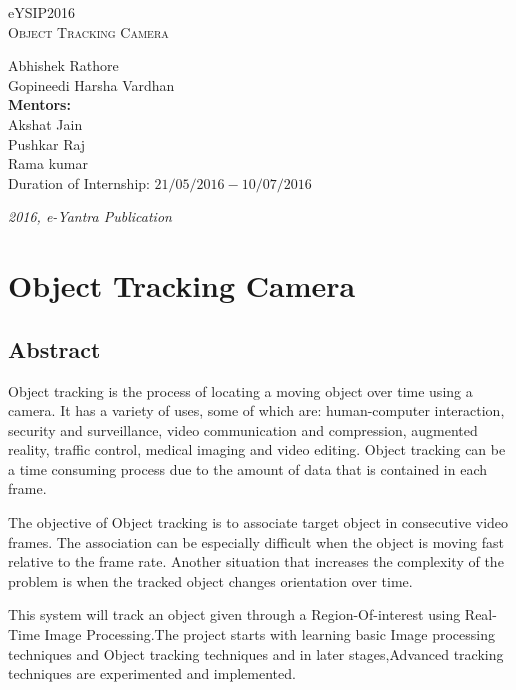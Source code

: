 \documentclass[a4paper,12pt,oneside]{book}
\begin{document}
\begin{titlepage}
\raggedright
{\Large eYSIP2016\\[1cm]}
{\Huge\scshape Object Tracking Camera \\[.1in]}
\vfill
\begin{flushright}
{\large Abhishek Rathore \\}
{\large Gopineedi Harsha Vardhan \\}
{\large \textbf{Mentors:} \\}
{\large Akshat Jain \\}
{\large Pushkar Raj \\}
{\large Rama kumar \\}
{\large Duration of Internship: $ 21/05/2016-10/07/2016 $ \\}
\end{flushright}

{\itshape 2016, e-Yantra Publication}
\end{titlepage}

\chapter[Project Tag]{Object Tracking Camera}
\section*{Abstract}
Object tracking is the process of locating a moving object over time using a camera. It has a variety of uses, some of which are: human-computer interaction, security and surveillance, video communication and compression, augmented reality, traffic control, medical imaging and video editing. Object tracking can be a time consuming process due to the amount of data that is contained in each frame.
 \par The objective of Object tracking is to associate target object in consecutive video frames. The association can be especially difficult when the object is moving fast relative to the frame rate. Another situation that increases the complexity of the problem is when the tracked object changes orientation over time.
 \par This system will track an object given through a Region-Of-interest using Real-Time Image Processing.The project starts with learning basic Image processing techniques and Object tracking techniques and in later stages,Advanced tracking techniques are experimented and implemented. 
\end{document}
